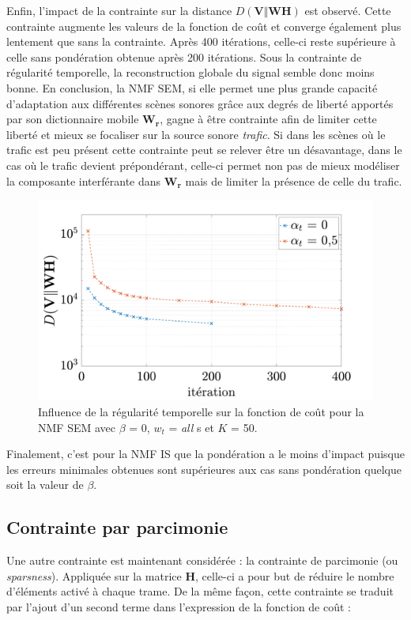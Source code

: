 Enfin, l'impact de la contrainte sur la distance $D(\mathbf{V}\Vert \mathbf{WH})$ est observé. Cette contrainte augmente les valeurs de la fonction de coût et converge également plus lentement que sans la contrainte. Après 400 itérations, celle-ci reste supérieure à celle sans pondération obtenue après 200 itérations. Sous la contrainte de régularité temporelle, la reconstruction globale du signal semble donc moins bonne. 
En conclusion, la NMF SEM, si elle permet une plus grande capacité d'adaptation aux différentes scènes sonores grâce aux degrés de liberté apportés par son dictionnaire mobile $\mathbf{W_r}$, gagne à être contrainte afin de limiter cette liberté et mieux se focaliser sur la source sonore \textit{trafic}. Si dans les scènes où le trafic est peu présent cette contrainte peut se relever être un désavantage, dans le cas où le trafic devient prépondérant, celle-ci permet non pas de mieux modéliser la composante interférante dans $\mathbf{W_r}$ mais de limiter la présence de celle du trafic.
 
\begin{figure}[h]
\centering
\includegraphics[width=.7\linewidth]{./figures/resultats/grafic_smooth_cost_beta0.pdf}
\caption{Influence de la régularité temporelle sur la fonction de coût pour la NMF SEM avec $\beta$ = 0, $w_t$ = \textit{all} s et $K$ = 50.}
\end{figure}

Finalement, c'est pour la NMF IS que la pondération a le moins d'impact puisque les erreurs minimales obtenues sont supérieures aux cas sans pondération quelque soit la valeur de $\beta$. 

\subsection{Contrainte par parcimonie}\label{part:smoothSEM}

Une autre contrainte est maintenant considérée : la contrainte de parcimonie (ou \textit{sparsness}). Appliquée sur la matrice $\mathbf{H}$, celle-ci a pour but de réduire le nombre d'éléments activé à chaque trame. De la même façon, cette contrainte se traduit par l'ajout d'un second terme dans l'expression de la fonction de coût : 

